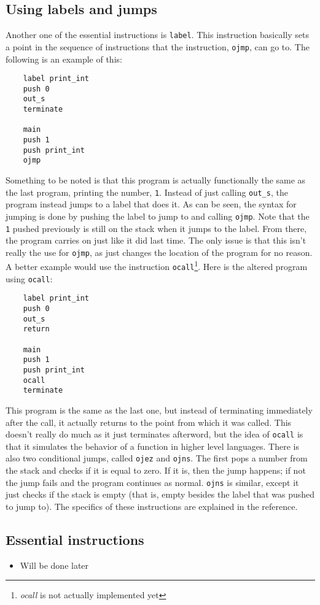 \documentclass[12pt]{report}
\begin{document}
  \subsection{Using labels and jumps}
  Another one of the essential instructions is \verb|label|.  This instruction basically
  sets a point in the sequence of instructions that the instruction, \verb|ojmp|, can
  go to.  The following is an example of this:
  \begin{verbatim}
	label print_int
	push 0
	out_s
	terminate

	main
	push 1
	push print_int
	ojmp
  \end{verbatim}
  Something to be noted is that this program is actually functionally the same as the
  last program, printing the number, \verb|1|.  Instead of just calling \verb|out_s|,
  the program instead jumps to a label that does it.  As can be seen, the syntax for
  jumping is done by pushing the label to jump to and calling \verb|ojmp|.  Note
  that the \verb|1| pushed previously is still on the stack when it jumps to the label.
  From there, the program carries on just like it did last time.  The only issue is that
  this isn't really the use for \verb|ojmp|, as just changes the location of the program
  for no reason.  A better example would use the instruction \verb|ocall|\footnote{\emph{ocall} is not actually implemented yet}.  Here is the
  altered program using \verb|ocall|:
  \begin{verbatim}
	label print_int
	push 0
	out_s
	return

	main
	push 1
	push print_int
	ocall
	terminate
  \end{verbatim}
  This program is the same as the last one, but instead of terminating immediately after
  the call, it actually returns to the point from which it was called.  This doesn't
  really do much as it just terminates afterword, but the idea of \verb|ocall| is that
  it simulates the behavior of a function in higher level languages.  There is also two
  conditional jumps, called \verb|ojez| and \verb|ojns|.  The first pops a number from
  the stack and checks if it is equal to zero.  If it is, then the jump happens; if not
  the jump fails and the program continues as normal.  \verb|ojns| is similar, except it
  just checks if the stack is empty (that is, empty besides the label that was pushed
  to jump to).  The specifics of these instructions are explained in the reference.
  \subsection{Essential instructions}
  \begin{itemize}
  \item Will be done later
  \end{itemize}
\end{document}
